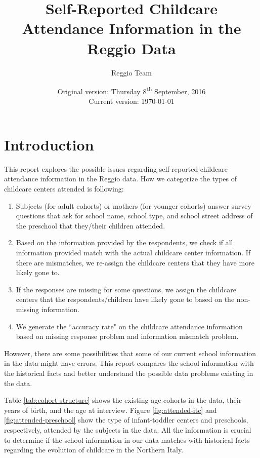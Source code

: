 




\title{Self-Reported Childcare Attendance Information in the Reggio Data}
\author{Reggio Team}
\date{Original version: Thursday 8\textsuperscript{th} September, 2016 \\ Current version: \today}
\maketitle

\doublespacing

\section{Introduction}

This report explores the possible issues regarding self-reported childcare attendance information in the Reggio data. How we categorize the types of childcare centers attended is following: 
\begin{enumerate}
\item Subjects (for adult cohorts) or mothers (for younger cohorts) answer survey questions that ask for school name, school type, and school street address of the preschool that they/their children attended. 
\item Based on the information provided by the respondents, we check if all information provided match with the actual childcare center information. If there are mismatches, we re-assign the childcare centers that they have more likely gone to.
\item If the responses are missing for some questions, we assign the childcare centers that the respondents/children have likely gone to based on the non-missing information. 
\item We generate the ``accuracy rate" on the childcare attendance information based on missing response problem and information mismatch problem. 
\end{enumerate}

However, there are some possibilities that some of our current school information in the data might have errors. This report compares the school information with the historical facts and better understand the possible data problems existing in the data. 

Table \ref{tab:cohort-structure} shows the existing age cohorts in the data, their years of birth, and the age at interview. Figure \ref{fig:attended-itc} and \ref{fig:attended-preschool} show the type of infant-toddler centers and preschools, respectively, attended by the subjects in the data. All the information is crucial to determine if the school information in our data matches with historical facts regarding the evolution of childcare in the Northern Italy.

